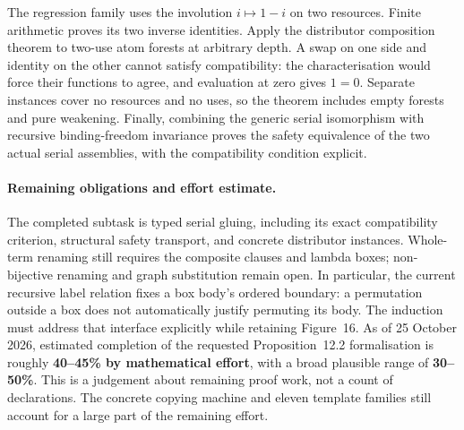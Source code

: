 
The regression family uses the involution $i\mapsto1-i$ on two resources.
Finite arithmetic proves its two inverse identities. Apply the distributor
composition theorem to two-use atom forests at arbitrary depth. A swap on one
side and identity on the other cannot satisfy compatibility: the characterisation
would force their functions to agree, and evaluation at zero gives $1=0$.
Separate instances cover no resources and no uses, so the theorem includes empty
forests and pure weakening. Finally, combining the generic serial isomorphism
with recursive binding-freedom invariance proves the safety equivalence of the
two actual serial assemblies, with the compatibility condition explicit.


\paragraph{Remaining obligations and effort estimate.}
The completed subtask is typed serial gluing, including its exact compatibility
criterion, structural safety transport, and concrete distributor instances.
Whole-term renaming still requires the composite clauses and lambda boxes;
non-bijective renaming and graph substitution remain open. In particular, the
current recursive label relation fixes a box body's ordered boundary: a
permutation outside a box does not automatically justify permuting its body.
The induction must address that interface explicitly while retaining Figure~16.
As of 25 October 2026, estimated completion of the requested Proposition~12.2
formalisation is roughly \textbf{40--45\% by mathematical effort}, with a broad
plausible range of \textbf{30--50\%}. This is a judgement about remaining proof
work, not a count of declarations. The concrete copying machine and eleven
template families still account for a large part of the remaining effort.
